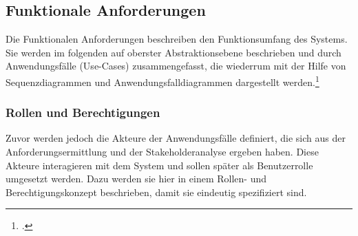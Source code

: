 \subsection{Funktionale Anforderungen}
Die Funktionalen Anforderungen beschreiben den Funktionsumfang des Systems. Sie werden im folgenden auf oberster Abstraktionsebene beschrieben und durch Anwendungsfälle (Use-Cases) zusammengefasst, die wiederrum mit der Hilfe von Sequenzdiagrammen und Anwendungsfalldiagrammen dargestellt werden.\footcite[Vgl.][S. 496]{balzert}

\subsubsection{Rollen und Berechtigungen}
Zuvor werden jedoch die Akteure der Anwendungsfälle definiert, die sich aus der Anforderungsermittlung und der Stakeholderanalyse ergeben haben. Diese Akteure interagieren mit dem System und sollen später als Benutzerrolle umgesetzt werden. Dazu werden sie hier in einem Rollen- und Berechtigungskonzept beschrieben, damit sie eindeutig spezifiziert sind.

